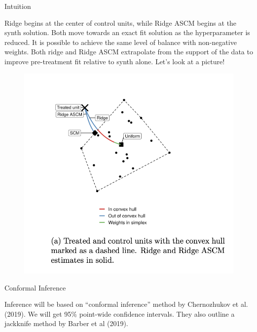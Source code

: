 \documentclass{beamer}
\begin{document}
\begin{frame}{Intuition}

Ridge begins at the center of control units, while Ridge ASCM begins at the synth solution. Both move towards an exact fit solution as the hyperparameter is reduced. It is possible to achieve the same level of balance with non-negative weights.  Both ridge and Ridge ASCM extrapolate from the support of the data to improve pre-treatment fit relative to synth alone. Let's look at a picture!


\end{frame}



\begin{frame}[plain]

	\begin{figure}
	\includegraphics[scale=0.5]{./lecture_includes/aug_1.png}
	\end{figure}
	
\end{frame}	


\begin{frame}{Conformal Inference}

Inference will be based on ``conformal inference'' method by Chernozhukov et al. (2019).  We will get 95\% point-wide confidence intervals. They also outline a jackknife method by Barber et al (2019). 

\end{frame}
\end{document}
